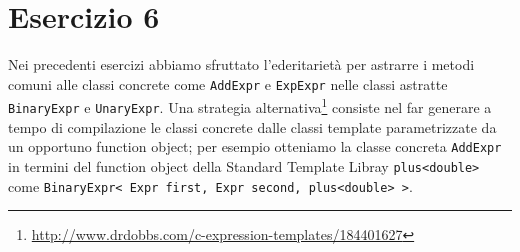 \section*{Esercizio 6}

Nei precedenti esercizi abbiamo sfruttato l'ederitarietà per astrarre i metodi
comuni alle classi concrete come \texttt{AddExpr} e \texttt{ExpExpr} nelle
classi astratte \texttt{BinaryExpr} e \texttt{UnaryExpr}. Una strategia
alternativa\footnote{\url{http://www.drdobbs.com/c-expression-templates/184401627}}
consiste nel far generare a tempo di compilazione le classi concrete dalle
classi template parametrizzate da un opportuno function object; per esempio
otteniamo la classe concreta \texttt{AddExpr} in termini del function object
della Standard Template Libray \texttt{plus<double>} come
\texttt{BinaryExpr< Expr first, Expr second, plus<double> >}.
